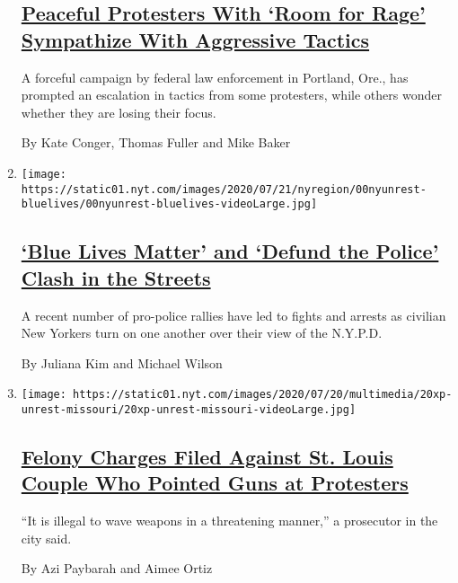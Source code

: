 \begin{enumerate}
{  \subsection{\texorpdfstring{\href{/2020/07/27/us/protests-divisions-blm.html}{Peaceful
  Protesters With `Room for Rage' Sympathize With Aggressive
  Tactics}}{Peaceful Protesters With `Room for Rage' Sympathize With Aggressive Tactics}}\label{peaceful-protesters-with-room-for-rage-sympathize-with-aggressive-tactics}}

  A forceful campaign by federal law enforcement in Portland, Ore., has
  prompted an escalation in tactics from some protesters, while others
  wonder whether they are losing their focus.

  By Kate Conger, Thomas Fuller and Mike Baker
\item
  \texttt{[image: https://static01.nyt.com/images/2020/07/21/nyregion/00nyunrest-bluelives/00nyunrest-bluelives-videoLarge.jpg]}

  \hypertarget{blue-lives-matter-and-defund-the-police-clash-in-the-streets}{%
  \subsection{\texorpdfstring{\href{/2020/07/22/nyregion/ny-back-the-blue-lives-matter-rallies.html}{`Blue
  Lives Matter' and `Defund the Police' Clash in the
  Streets}}{`Blue Lives Matter' and `Defund the Police' Clash in the Streets}}\label{blue-lives-matter-and-defund-the-police-clash-in-the-streets}}

  A recent number of pro-police rallies have led to fights and arrests
  as civilian New Yorkers turn on one another over their view of the
  N.Y.P.D.

  By Juliana Kim and Michael Wilson
\item
  \texttt{[image: https://static01.nyt.com/images/2020/07/20/multimedia/20xp-unrest-missouri/20xp-unrest-missouri-videoLarge.jpg]}

  \hypertarget{felony-charges-filed-against-st-louis-couple-who-pointed-guns-at-protesters}{%
  \subsection{\texorpdfstring{\href{/2020/07/20/us/mark-patricia-mccloskey-charges.html}{Felony
  Charges Filed Against St. Louis Couple Who Pointed Guns at
  Protesters}}{Felony Charges Filed Against St. Louis Couple Who Pointed Guns at Protesters}}\label{felony-charges-filed-against-st-louis-couple-who-pointed-guns-at-protesters}}

  ``It is illegal to wave weapons in a threatening manner,'' a
  prosecutor in the city said.

  By Azi Paybarah and Aimee Ortiz
\end{enumerate}

